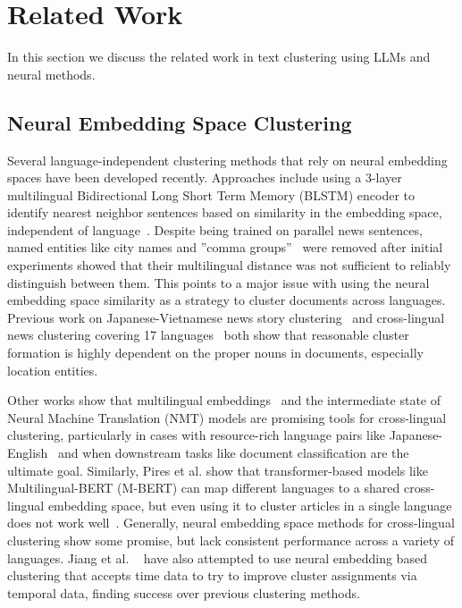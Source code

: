 \section{Related Work}\label{section:related_work}

In this section we discuss the related work in text clustering using LLMs and neural methods.

\subsection{Neural Embedding Space Clustering} 

Several language-independent clustering methods that rely on neural embedding spaces have been developed recently.
Approaches include using a 3-layer multilingual Bidirectional Long Short Term Memory (BLSTM) encoder to identify nearest neighbor sentences based on similarity in the embedding space, independent of language~\cite{Schw18}. 
Despite being trained on parallel news sentences, named entities like city names and ''comma groups''~\cite{Lieb10b} were removed after initial experiments showed that their multilingual distance was not sufficient to reliably distinguish between them. 
This points to a major issue with using the neural embedding space similarity as a strategy to cluster documents across languages. 
Previous work on Japanese-Vietnamese news story clustering~\cite{Hong17} and cross-lingual news clustering covering 17 languages~\cite{Schneider2023} both show that reasonable cluster formation is highly dependent on the proper nouns in documents, especially location entities. 

Other works show that multilingual embeddings~\cite{Amma18} and the intermediate state of Neural Machine Translation (NMT) models are promising tools for cross-lingual clustering, particularly in cases with resource-rich language pairs like Japanese-English~\cite{Seki18} and when downstream tasks like document classification are the ultimate goal. 
Similarly, Pires et al. show that transformer-based models like Multilingual-BERT (M-BERT) can map different languages to a shared cross-lingual embedding space, but even using it to cluster articles in a single language does not work well~\cite{Pire19, Stan20}. 
Generally, neural embedding space methods for cross-lingual clustering show some promise, but lack consistent performance across a variety of languages.
%
Jiang et al. ~\cite{jiang-etal-2024-topic} have also attempted to use neural embedding based clustering that accepts time data to try to improve cluster assignments via temporal data, finding success over previous clustering methods.

